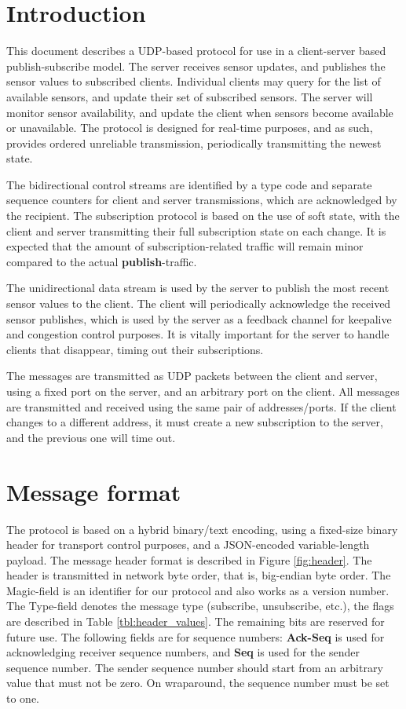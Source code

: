 \documentclass[a4paper]{article}
\begin{document}


\tableofcontents
\newpage

\section{Introduction}
This document describes a UDP-based protocol for use in a client-server based publish-subscribe model.
The server receives sensor updates, and publishes the sensor values to subscribed clients.
Individual clients may query for the list of available sensors, and update their set of subscribed sensors.
The server will monitor sensor availability, and update the client when sensors become available or unavailable.
The protocol is designed for real-time purposes, and as such, provides ordered unreliable transmission, periodically transmitting the newest state.

The bidirectional control streams are identified by a type code and separate sequence counters for client and server transmissions, which are acknowledged by the recipient.
The subscription protocol is based on the use of soft state, with the client and server transmitting their full subscription state on each change.
It is expected that the amount of subscription-related traffic will remain minor compared to the actual \textbf{publish}-traffic.

The unidirectional data stream is used by the server to publish the most recent sensor values to the client.
The client will periodically acknowledge the received sensor publishes, which is used by the server as a feedback channel for keepalive and congestion control purposes.
It is vitally important for the server to handle clients that disappear, timing out their subscriptions.

The messages are transmitted as UDP packets between the client and server, using a fixed port on the server, and an arbitrary port on the client.
All messages are transmitted and received using the same pair of \- addresses/ports.
If the client changes to a different address, it must create a new subscription to the server, and the previous one will time out.

\section{Message format}
The protocol is based on a hybrid binary/text encoding, using a fixed-size binary header for transport control purposes, and a JSON-encoded variable-length payload.
The message header format is described in Figure \ref{fig:header}. The header
is transmitted in network byte order, that is, big-endian byte order. The 
Magic-field is an identifier for our protocol and also works as a version
number. The Type-field denotes the message type (subscribe, unsubscribe, etc.),
the flags are described in Table \ref{tbl:header_values}. The remaining bits are 
reserved for future use. The following fields are for sequence numbers: 
\textbf{Ack-Seq} is used for acknowledging receiver sequence numbers, and 
\textbf{Seq} is used for the sender sequence number. The sender sequence number
should start from an arbitrary value that must not be zero. On wraparound, the
sequence number must be set to one.
\end{document}
